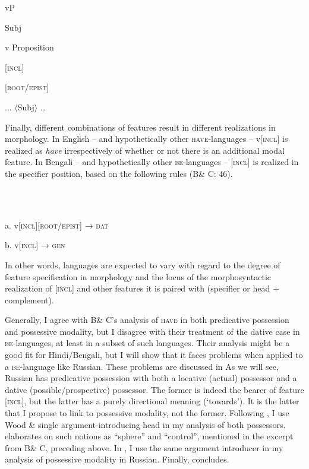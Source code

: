 \documentclass[output=paper,modfonts,nonflat]{langsci/langscibook}
\begin{document}
            vP  

  

  Subj

  v   Proposition

    [\textsc{incl}]

    \textsc{[root/epist]}  

  ... \textsc{${\langle}$}Subj${\rangle}$ …

Finally, different combinations of features result in different realizations in morphology. In English – and hypothetically other \textsc{have}{}-languages – v[\textsc{incl}] is realized as \textit{have} irrespectively of whether or not there is an additional modal feature. In Bengali – and hypothetically other \textsc{be}{}-languages – [\textsc{incl}] is realized in the specifier position, based on the following rules (B\& C: 46).

\ea%
    \label{ex:key:5}
    \gll\\
        \\
    \glt
    \z

          a.  v\textsc{[incl][root/epist]} → \textsc{dat}

  b.  v\textsc{[incl]} → \textsc{gen}       

In other words, languages are expected to vary with regard to the degree of feature specification in morphology and the locus of the morphosyntactic realization of [\textsc{incl]} and other features it is paired with (specifier or head + complement).   

Generally, I agree with B\& C’s analysis of \textsc{have} in both predicative possession and possessive modality, but I disagree with their treatment of the dative case in \textsc{be}{}-languages, at least in a subset of such languages. Their analysis might be a good fit for Hindi/Bengali, but I will show that it faces problems when applied to a \textsc{be}{}-language like Russian. These problems are discussed in  As we will see, Russian has predicative possession with both a locative (actual) possessor and a dative (possible/prospective) possessor. The former is indeed the bearer of feature [\textsc{incl}], but the latter has a purely directional meaning (‘towards’). It is the latter that I propose to link to possessive modality, not the former. Following \citet{Tsedryk2019}, I use Wood \&  single argument-introducing head in my analysis of both possessors.  elaborates on such notions as “sphere” and “control”, mentioned in the excerpt from B\& C, preceding  above. In , I use the same argument introducer in my analysis of possessive modality in Russian. Finally,  concludes. 
\end{document}
